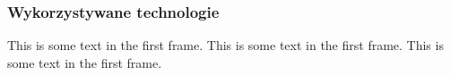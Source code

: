 \begin{frame}
    \frametitle{Wykorzystywane technologie}
    This is some text in the first frame. This is some text in the first frame. This is some text in the first frame.
\end{frame}